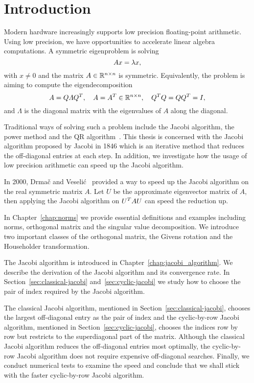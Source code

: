 \chapter{Introduction}

Modern hardware increasingly supports low precision floating-point
arithmetic. Using low precision, we have opportunities to accelerate linear
algebra computations. A symmetric eigenproblem is solving
\begin{equation}\notag
  Ax = \lambda x,
\end{equation}
with $x\neq 0$ and the matrix $A\in\mathbb{R}^{n\times n}$ is symmetric. Equivalently, the
problem is aiming to compute the eigendecomposition
\begin{equation}\notag
  A = Q\varLambda Q^T,\quad A = A^T \in \mathbb{R}^{n\times n},\quad Q^T Q = QQ^T = I,
\end{equation}
and $\varLambda$ is the diagonal matrix with the eigenvalues of $A$ along
the diagonal.

Traditional ways of solving such a problem include the Jacobi algorithm,
the power method and the QR algorithm~. This thesis is concerned with the
Jacobi algorithm proposed by Jacobi in 1846 which is an iterative method
that reduces the off-diagonal entries at each step. In addition, we
investigate how the usage of low precision arithmetic can speed up the
Jacobi algorithm.

In 2000, Drmač and Veselić~ provided
a way to speed up the Jacobi algorithm on the real symmetric matrix $A$.
Let $U$ be the approximate eigenvector matrix of $A$, then applying the
Jacobi algorithm on $U^T A U$ can speed the reduction up.

In Chapter~\ref{chap:norms} we provide essential definitions and examples
including norms, orthogonal matrix and the singular value decomposition. We
introduce two important classes of the orthogonal matrix, the Givens
rotation and the Householder transformation.

The Jacobi algorithm is introduced in Chapter~\ref{chap:jacobi_algorithm}.
We describe the derivation of the Jacobi algorithm and its convergence
rate. In Section~\ref{sec:classical-jacobi} and~\ref{sec:cyclic-jacobi} we
study how to choose the pair of index required by the Jacobi algorithm.

The classical Jacobi algorithm, mentioned in
Section~\ref{sec:classical-jacobi}, chooses the largest off-diagonal entry
as the pair of index and the cyclic-by-row Jacobi algorithm, mentioned in
Section~\ref{sec:cyclic-jacobi}, chooses the indices row by row but
restricts to the superdiagonal part of the matrix. Although the classical
Jacobi algorithm reduces the off-diagonal entries most optimally, the
cyclic-by-row Jacobi algorithm does not require expensive off-diagonal
searches. Finally, we conduct numerical tests to examine the speed and
conclude that we shall stick with the faster cyclic-by-row Jacobi
algorithm.


